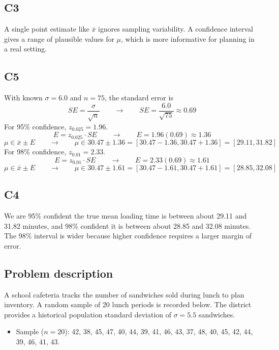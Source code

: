 \begin{ExamProblems}
		\subsection*{C3}
		A single point estimate like $\bar{x}$ ignores sampling variability. A confidence interval gives a range of plausible values for $\mu$, which is more informative for planning in a real setting.

		\subsection*{C5}
		With known $\sigma = 6.0$ and $n=75$, the standard error is
		\[
		SE = \frac{\sigma}{\sqrt{n}} \qquad \longrightarrow \qquad SE = \frac{6.0}{\sqrt{75}} \approx 0.69
		\]
		For 95\% confidence, $z_{0.025}=1.96$.
		\[
		E = z_{0.025} \cdot SE \qquad \longrightarrow \qquad E = 1.96(0.69) \approx 1.36
		\]
		\[
		\mu \in \bar{x} \pm E \qquad \longrightarrow \qquad \mu \in 30.47 \pm 1.36 = [30.47 - 1.36, 30.47 + 1.36] = [29.11, 31.82]
		\]
		For 98\% confidence, $z_{0.01}=2.33$.
		\[
		E = z_{0.01} \cdot SE \qquad \longrightarrow \qquad E = 2.33(0.69) \approx 1.61
		\]
		\[
		\mu \in \bar{x} \pm E \qquad \longrightarrow \qquad \mu \in 30.47 \pm 1.61 = [30.47 - 1.61, 30.47 + 1.61] = [28.85, 32.08]
		\]

		\subsection*{C4}
		We are 95\% confident the true mean loading time is between about 29.11 and 31.82 minutes, and 98\% confident it is between about 28.85 and 32.08 minutes. The 98\% interval is wider because higher confidence requires a larger margin of error.

		\item
		\subsection*{Problem description}
		A school cafeteria tracks the number of sandwiches sold during lunch to plan inventory.
		A random sample of 20 lunch periods is recorded below. The district provides a historical population standard deviation of \(\sigma = 5.5\) sandwiches.

		\begin{itemize}
			\item Sample (\(n = 20\)): 42, 38, 45, 47, 40, 44, 39, 41, 46, 43, 37, 48, 40, 45, 42, 44, 39, 46, 41, 43.
		\end{itemize}


\end{ExamProblems}
